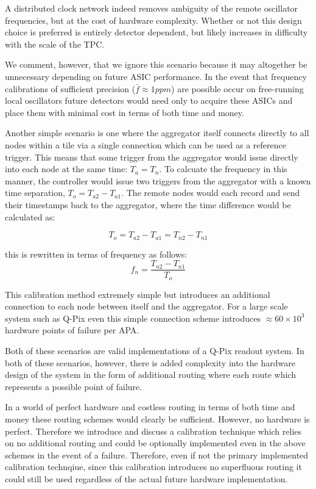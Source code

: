 A distributed clock network indeed removes ambiguity of the remote oscillator frequencies, but at the cost of hardware complexity.
Whether or not this design choice is preferred is entirely detector dependent, but likely increases in difficulty with the scale of the TPC.

We comment, however, that we ignore this scenario because it may altogether be unnecessary depending on future ASIC performance.
In the event that frequency calibrations of sufficient precision ($\bar{f} \approx 1 ppm$) are possible occur on free-running local oscillators future detectors would need only to acquire these ASICs and place them with minimal cost in terms of both time and money.

Another simple scenario is one where the aggregator itself connects directly to all nodes within a tile via a single connection which can be used as a reference trigger.
This means that some trigger from the aggregator would issue directly into each node at the same time: $T_{a} = T_{n}$.
To calcuate the frequency in this manner, the controller would issue two triggers from the aggregator with a known time separation, $T_{o} = T_{a2} - T_{a1}$.
The remote nodes would each record and send their timestamps back to the aggregator, where the time difference would be calculated as:

\begin{equation}
  T_{o} = T_{a2} - T_{a1} = T_{n2} - T_{n1}
\end{equation}

this is rewritten in terms of frequency as follows:
\begin{equation}
  f_{n} = \frac{T_{n2} - T_{n1}}{T_{o}}
\end{equation}

This calibration method extremely simple but introduces an additional connection to each node between itself and the aggregator.
For a large scale system such as Q-Pix even this simple connection scheme introduces $\approx 60\times 10^{3}$ hardware points of failure per APA.

Both of these scenarios are valid implementations of a Q-Pix readout system.
In both of these scenarios, however, there is added complexity into the hardware design of the system in the form of additional routing where each route which represents a possible point of failure.

In a world of perfect hardware and costless routing in terms of both time and money these routing schemes would clearly be sufficient.
However, no hardware is perfect.
Therefore we introduce and discuss a calibration technique which relies on no additional routing and could be optionally implemented even in the above schemes in the event of a failure.
Therefore, even if not the primary implemented calibration technqiue, since this calibration introduces no superfluous routing it could still be used regardless of the actual future hardware implementation.

